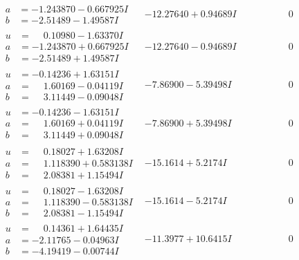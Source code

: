 \documentclass[1p]{elsarticle_modified}
\theoremstyle{definition}
\begin{document}
$$\begin{array}{c|c|c}
\begin{aligned}
a &= -1.243870 - 0.667925 I \\
b &= -2.51489 - 1.49587 I\end{aligned}
 & -12.27640 + 0.94689 I & \phantom{-0.000000 } 0 \\ \hline\begin{aligned}
u &= \phantom{-}0.10980 - 1.63370 I \\
a &= -1.243870 + 0.667925 I \\
b &= -2.51489 + 1.49587 I\end{aligned}
 & -12.27640 - 0.94689 I & \phantom{-0.000000 } 0 \\ \hline\begin{aligned}
u &= -0.14236 + 1.63151 I \\
a &= \phantom{-}1.60169 - 0.04119 I \\
b &= \phantom{-}3.11449 - 0.09048 I\end{aligned}
 & -7.86900 - 5.39498 I & \phantom{-0.000000 } 0 \\ \hline\begin{aligned}
u &= -0.14236 - 1.63151 I \\
a &= \phantom{-}1.60169 + 0.04119 I \\
b &= \phantom{-}3.11449 + 0.09048 I\end{aligned}
 & -7.86900 + 5.39498 I & \phantom{-0.000000 } 0 \\ \hline\begin{aligned}
u &= \phantom{-}0.18027 + 1.63208 I \\
a &= \phantom{-}1.118390 + 0.583138 I \\
b &= \phantom{-}2.08381 + 1.15494 I\end{aligned}
 & -15.1614 + 5.2174 I & \phantom{-0.000000 } 0 \\ \hline\begin{aligned}
u &= \phantom{-}0.18027 - 1.63208 I \\
a &= \phantom{-}1.118390 - 0.583138 I \\
b &= \phantom{-}2.08381 - 1.15494 I\end{aligned}
 & -15.1614 - 5.2174 I & \phantom{-0.000000 } 0 \\ \hline\begin{aligned}
u &= \phantom{-}0.14361 + 1.64435 I \\
a &= -2.11765 - 0.04963 I \\
b &= -4.19419 - 0.00744 I\end{aligned}
 & -11.3977 + 10.6415 I & \phantom{-0.000000 } 0 \\ \hline\begin{aligned}

\end{aligned}
\end{array}$$
\end{document}

